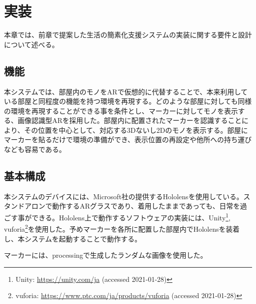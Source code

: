 
\chapter{実装}
\label{chap:implementation}

本章では、前章で提案した生活の簡素化支援システムの実装に関する要件と設計について述べる。

\newpage

\section{機能}
本システムでは、部屋内のモノをARで仮想的に代替することで、本来利用している部屋と同程度の機能を持つ環境を再現する。どのような部屋に対しても同様の環境を再現することができる事を条件とし、マーカーに対してモノを表示する、画像認識型ARを採用した。部屋内に配置されたマーカーを認識することにより、その位置を中心として、対応する3Dないし2Dのモノを表示する。部屋にマーカーを貼るだけで環境の準備ができ、表示位置の再設定や他所への持ち運びなども容易である。

\section{基本構成}

本システムのデバイスには、Microsoft社の提供するHololensを使用している。スタンドアロンで動作するARグラスであり、着用したままであっても、日常を過ごす事ができる。Hololens上で動作するソフトウェアの実装には、Unity\footnote{Unity: \url{https://unity.com/ja} (accessed 2021-01-28)}, vuforia\footnote{vuforia: \url{https://www.ptc.com/ja/products/vuforia} (accessed 2021-01-28)}を使用した。予めマーカーを各所に配置した部屋内でHololensを装着し、本システムを起動することで動作する。

マーカーには、processingで生成したランダムな画像を使用した。

